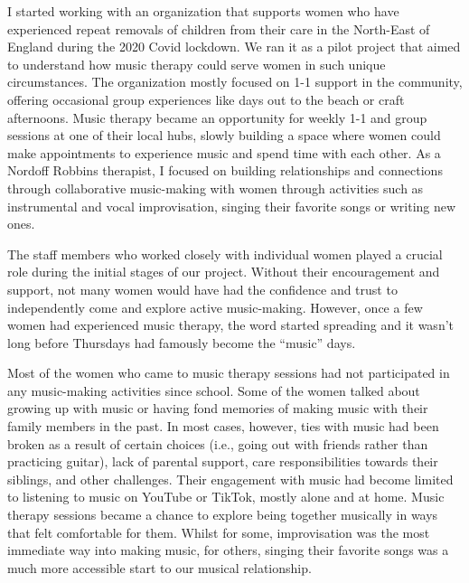 \documentclass[authordate, empirical, issue]{jote-new-article}
\begin{document}
I started working with an organization that supports women who have experienced repeat removals of children from their care in the North-East of England during the 2020 Covid lockdown. We ran it as a pilot project that aimed to understand how music therapy could serve women in such unique circumstances. The organization mostly focused on 1-1 support in the community, offering occasional group experiences like days out to the beach or craft afternoons. Music therapy became an opportunity for weekly 1-1 and group sessions at one of their local hubs, slowly building a space where women could make appointments to experience music and spend time with each other. As a Nordoff Robbins therapist, I focused on building relationships and connections through collaborative music-making with women through activities such as instrumental and vocal improvisation, singing their favorite songs or writing new ones.







The staff members who worked closely with individual women played a crucial role during the initial stages of our project. Without their encouragement and support, not many women would have had the confidence and trust to independently come and explore active music-making. However, once a few women had experienced music therapy, the word started spreading and it wasn't long before Thursdays had famously become the “music” days.







Most of the women who came to music therapy sessions had not participated in any music-making activities since school. Some of the women talked about growing up with music or having fond memories of making music with their family members in the past. In most cases, however, ties with music had been broken as a result of certain choices (i.e., going out with friends rather than practicing guitar), lack of parental support, care responsibilities towards their siblings, and other challenges. Their engagement with music had become limited to listening to music on YouTube or TikTok, mostly alone and at home. Music therapy sessions became a chance to explore being together musically in ways that felt comfortable for them. Whilst for some, improvisation was the most immediate way into making music, for others, singing their favorite songs was a much more accessible start to our musical relationship.
\end{document}

